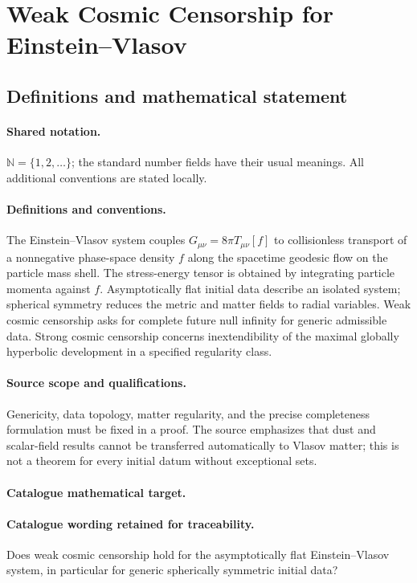 \documentclass[11pt]{article}
\begin{document}
\section{Weak Cosmic Censorship for Einstein–Vlasov}\label{statement}

\subsection{Definitions and mathematical statement}

\paragraph{Shared notation.}$\mathbb N=\{1,2,\ldots\}$; the standard number fields have their usual meanings. All additional conventions are stated locally.


\paragraph{Definitions and conventions.} The Einstein--Vlasov system couples $G_{\mu\nu}=8\pi T_{\mu\nu}[f]$ to collisionless transport of a nonnegative phase-space density $f$ along the spacetime geodesic flow on the particle mass shell. The stress-energy tensor is obtained by integrating particle momenta against $f$. Asymptotically flat initial data describe an isolated system; spherical symmetry reduces the metric and matter fields to radial variables. Weak cosmic censorship asks for complete future null infinity for generic admissible data. Strong cosmic censorship concerns inextendibility of the maximal globally hyperbolic development in a specified regularity class.

\paragraph{Source scope and qualifications.} Genericity, data topology, matter regularity, and the precise completeness formulation must be fixed in a proof. The source emphasizes that dust and scalar-field results cannot be transferred automatically to Vlasov matter; this is not a theorem for every initial datum without exceptional sets.

\paragraph{Catalogue mathematical target.}
\paragraph{Catalogue wording retained for traceability.}
Does weak cosmic censorship hold for the asymptotically flat Einstein–Vlasov system, in particular for generic spherically symmetric initial data?
\end{document}

